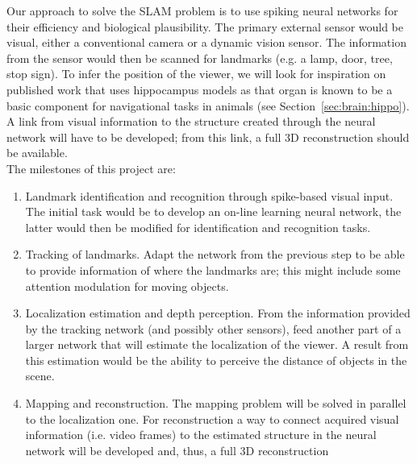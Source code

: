 Our approach to solve the SLAM problem is to use spiking neural networks for their efficiency and biological plausibility. The primary external sensor would be visual, either a conventional camera or a dynamic vision sensor. The information from the sensor would then be scanned for landmarks (e.g. a lamp, door, tree, stop sign). To infer the position of the viewer, we will look for inspiration on published work that uses hippocampus models as that organ is known to be a basic component for navigational tasks in animals (see Section~\ref{sec:brain:hippo}). A link from visual information to the structure created through the neural network will have to be developed; from this link, a full 3D reconstruction should be available.\\

The milestones of this project are:
\begin{enumerate}
  \item Landmark identification and recognition through spike-based visual input. The initial task would be to develop an on-line learning neural network, the latter would then be modified for identification and recognition tasks.
  \item Tracking of landmarks. Adapt the network from the previous step to be able to provide information of where the landmarks are; this might include some attention modulation for moving objects.
  \item Localization estimation and depth perception. From the information provided by the tracking network (and possibly other sensors), feed another part of a larger network that will estimate the localization of the viewer. A result from this estimation would be the ability to perceive the distance of objects in the scene. 
  \item Mapping and reconstruction. The mapping problem will be solved in parallel to the localization one. For reconstruction a way to connect acquired visual information (i.e. video frames) to the estimated structure in the neural network will be developed and, thus, a full 3D reconstruction 
\end{enumerate}